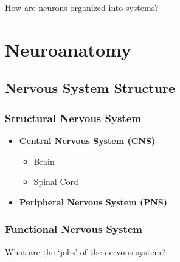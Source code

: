 How are neurons organized into systems? 

\section{Neuroanatomy}

\subsection{Nervous System Structure}

\subsubsection{Structural Nervous System}

\begin{itemize}
    \item \textbf{Central Nervous System (CNS)}
    \begin{itemize}
        \item Brain
        \item Spinal Cord
    \end{itemize}
    \item \textbf{Peripheral Nervous System (PNS)}

\end{itemize}

\subsubsection{Functional Nervous System}

What are the `jobs' of the nervous system?

